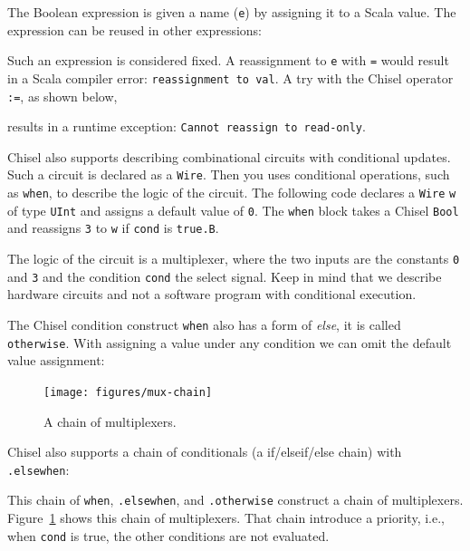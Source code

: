 \documentclass[%
    10pt,
    headinclude, footexclude,
    openright, %
    notitlepage,
    cleardoubleempty,
    headsepline,
    pointlessnumbers,
    bibtotoc, idxtotoc,
    ]{scrbook}
\newcommand{\code}[1]{{\small{\texttt{#1}}}}
\begin{document}
\noindent The Boolean expression is given a name (\code{e}) by assigning it
to a Scala value. The expression can be reused in other expressions:


Such an expression is considered fixed. A reassignment to \code{e}
with \code{=} would result in a Scala compiler error: \code{reassignment to val}.
A try with the Chisel operator \code{:=}, as shown below,


\noindent results in a runtime exception: \code{Cannot reassign to read-only}.

Chisel also supports describing combinational circuits with conditional updates.
Such a circuit is declared as a \code{Wire}. Then you uses conditional operations,
such as \code{when}, to describe the logic of the circuit.
The following code declares a \code{Wire} \code{w} of type \code{UInt} and assigns a default
value of \code{0}. The \code{when} block takes a Chisel \code{Bool} and reassigns
\code{3} to \code{w} if \code{cond} is \code{true.B}.


\noindent The logic of the circuit is a multiplexer, where the two inputs are the constants
\code{0} and \code{3} and the condition \code{cond} the select signal.
Keep in mind that we describe hardware circuits and not a software program with conditional
execution.

The Chisel condition construct \code{when} also has a form of \emph{else}, it is called
\code{otherwise}. With assigning a value under any condition we can omit the default
value assignment:



\begin{figure}
  \centering
  \texttt{[image: figures/mux-chain]}
  \caption{A chain of multiplexers.}
  \label{fig:mux-chain}
\end{figure}

Chisel also supports a chain of conditionals (a if/elseif/else chain) with \code{.elsewhen}:


\noindent This chain of \code{when}, \code{.elsewhen}, and \code{.otherwise}
construct a chain of multiplexers. Figure~\ref{fig:mux-chain} shows this chain of multiplexers.
That chain introduce a priority, i.e., when \code{cond} is true, the other conditions
are not evaluated.
\end{document}
